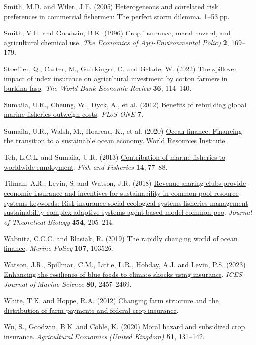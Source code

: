 \documentclass[
  letterpaper,
  DIV=11,
  numbers=noendperiod]{scrartcl}
\newlength{\cslhangindent}
\newenvironment{CSLReferences}[2] %
 {\begin{list}{}{%
  \setlength{\itemindent}{0pt}
  \setlength{\leftmargin}{0pt}
  \setlength{\parsep}{0pt}
  \ifodd #1
   \setlength{\leftmargin}{\cslhangindent}
   \setlength{\itemindent}{-1\cslhangindent}
  \fi
  \setlength{\itemsep}{#2\baselineskip}}}
 {\end{list}}
\theoremstyle{plain}
\theoremstyle{plain}
\theoremstyle{remark}
\begin{document}
\begin{CSLReferences}{1}{0}
Smith, M.D. and Wilen, J.E. (2005) Heterogeneous and correlated risk
preferences in commercial fishermen: The perfect storm dilemma. 1--53
pp.

Smith, V.H. and Goodwin, B.K. (1996)
\href{https://doi.org/10.2307/1243714}{Crop insurance, moral hazard, and
agricultural chemical use}. \emph{The Economics of Agri-Environmental
Policy} \textbf{2}, 169--179.

Stoeffler, Q., Carter, M., Guirkinger, C. and Gelade, W. (2022)
\href{https://doi.org/10.1093/wber}{The spillover impact of index
insurance on agricultural investment by cotton farmers in burkina faso}.
\emph{The World Bank Economic Review} \textbf{36}, 114--140.

Sumaila, U.R., Cheung, W., Dyck, A., et al. (2012)
\href{https://doi.org/10.1371/journal.pone.0040542}{Benefits of
rebuilding global marine fisheries outweigh costs}. \emph{PLoS ONE}
\textbf{7}.

Sumaila, U.R., Walsh, M., Hoareau, K., et al. (2020)
\href{https://www.oceanpanel.org/blue-}{Ocean finance: Financing the
transition to a sustainable ocean economy}. World Resources Institute.

Teh, L.C.L. and Sumaila, U.R. (2013)
\href{https://doi.org/10.1111/j.1467-2979.2011.00450.x}{Contribution of
marine fisheries to worldwide employment}. \emph{Fish and Fisheries}
\textbf{14}, 77--88.

Tilman, A.R., Levin, S. and Watson, J.R. (2018)
\href{https://doi.org/10.1016/j.jtbi.2018.06.003}{Revenue-sharing clubs
provide economic insurance and incentives for sustainability in
common-pool resource systems keywords: Risk insurance social-ecological
systems fisheries management sustainability complex adaptive systems
agent-based model common-poo}. \emph{Journal of Theoretical Biology}
\textbf{454}, 205--214.

Wabnitz, C.C.C. and Blasiak, R. (2019)
\href{https://doi.org/10.1016/j.marpol.2019.103526}{The rapidly changing
world of ocean finance}. \emph{Marine Policy} \textbf{107}, 103526.

Watson, J.R., Spillman, C.M., Little, L.R., Hobday, A.J. and Levin, P.S.
(2023) \href{https://doi.org/10.1093/icesjms/fsad175}{Enhancing the
resilience of blue foods to climate shocks using insurance}. \emph{ICES
Journal of Marine Science} \textbf{80}, 2457--2469.

White, T.K. and Hoppe, R.A. (2012)
\href{https://www.ers.usda.gov}{Changing farm structure and the
distribution of farm payments and federal crop insurance}.

Wu, S., Goodwin, B.K. and Coble, K. (2020)
\href{https://doi.org/10.1111/agec.12545}{Moral hazard and subsidized
crop insurance}. \emph{Agricultural Economics (United Kingdom)}
\textbf{51}, 131--142.

\end{CSLReferences}
\end{document}
